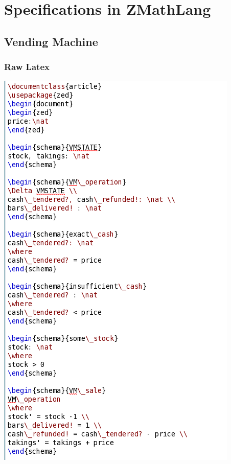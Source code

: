 \chapter{Specifications in ZMathLang}
\label{app:other}

\section{Vending Machine}
\label{app:vm}

\subsection{Raw Latex}
\label{app:vm0}
%
\includegraphics[scale=0.5]{examples/vm/0imagea.png}

